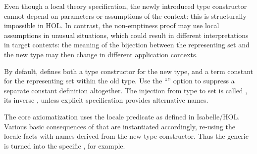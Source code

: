 \begin{isabellebody}
\begin{isamarkuptext}
\begin{description}
  Even though a local theory specification, the newly introduced type
  constructor cannot depend on parameters or assumptions of the
  context: this is structurally impossible in HOL.  In contrast, the
  non-emptiness proof may use local assumptions in unusual situations,
  which could result in different interpretations in target contexts:
  the meaning of the bijection between the representing set 
  and the new type  may then change in different application
  contexts.

  By default, \hyperlink{command.HOL.typedef}{\mbox{}} defines both a type
  constructor  for the new type, and a term constant  for the representing set within the old type.  Use the ``'' option to suppress a separate constant definition
  altogether.  The injection from type to set is called ,
  its inverse , unless explicit \hyperlink{keyword.HOL.morphisms}{\mbox{}} specification provides alternative names.

  The core axiomatization uses the locale predicate  as defined in Isabelle/HOL.  Various basic
  consequences of that are instantiated accordingly, re-using the
  locale facts with names derived from the new type constructor.  Thus
  the generic  is turned into the specific
  , for example.


\end{description}
\end{isamarkuptext}
\end{isabellebody}

